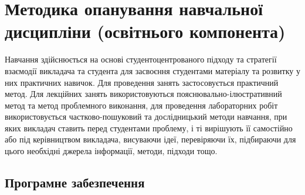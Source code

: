 \documentclass{Syllabus}
\begin{document}
{}

\section{Методика опанування навчальної дисципліни (освітнього компонента)}

Навчання здійснюється на основі студентоцентрованого підходу та стратегії взаємодії викладача та студента для засвоєння студентами матеріалу та розвитку у них практичних навичок. Для проведення занять застосовується практичний метод. Для лекційних занять використовуються пояснювально-ілюстративний метод та метод проблемного виконання, для проведення лабораторних робіт використовується частково-пошуковий та дослідницький методи навчання, при яких викладач ставить перед студентами проблему, і ті вирішують її самостійно або під керівництвом викладача, висуваючи ідеї, перевіряючи їх, підбираючи для цього необхідні джерела інформації, методи, підходи тощо.


\subsection*{Програмне забезпечення}
\end{document}
